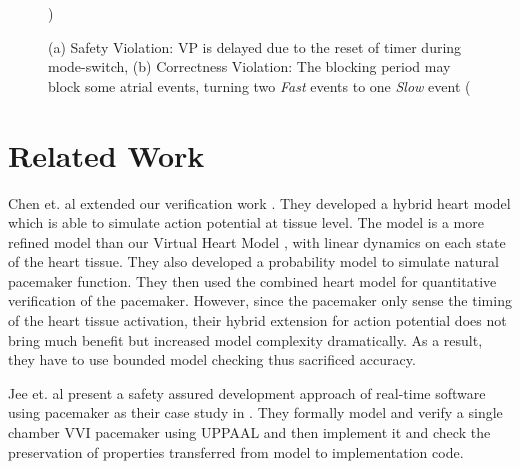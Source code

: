 \begin{figure}
\centering
	\caption{(a) Safety Violation: VP is delayed due to the reset of timer during mode-switch, (b) Correctness Violation: The blocking period may block some atrial events, turning two \emph{Fast} events to one \emph{Slow} event (\cite{TACAS12}})
\end{figure} 

\section{Related Work}
Chen et. al \cite{Marta} extended our verification work \cite{TACAS12}. They developed a hybrid heart model which is able to simulate action potential at tissue level. The model is a more refined model than our Virtual Heart Model \cite{VHM_proc}, with linear dynamics on each state of the heart tissue. They also developed a probability model to simulate natural pacemaker function. They then used the combined heart model for quantitative verification of the pacemaker. However, since the pacemaker only sense the timing of the heart tissue activation, their hybrid extension for action potential does not bring much benefit but increased model complexity dramatically. As a result, they have to use bounded model checking thus sacrificed accuracy.

Jee et. al present a safety assured development approach of real-time software using pacemaker as their case study in \cite{Jee}. They formally model and verify a single chamber VVI pacemaker using UPPAAL and then implement it and check the preservation of properties transferred from model to implementation code. 

